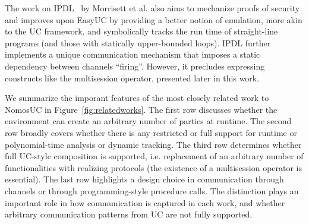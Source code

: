 The work on IPDL~\cite{ipdl} by Morrisett et al. also aims to mechanize proofs of security and improves upon EasyUC by providing a better notion of emulation,
more akin to the UC framework, and symbolically tracks the run time of straight-line programs (and those with statically upper-bounded loops).
IPDL further implements a unique communication mechanism that imposes a static dependency between channels ``firing''.
However, it precludes expressing constructs like the multisession operator, presented later in this work. 

We summarize the imporant features of the most closely related work to NomosUC in Figure~\ref{fig:relatedworks}.
The first row discusses whether the environment can create an arbitrary number of parties at runtime. %
The second row broadly covers whether there is any restricted or full support for runtime or polynomial-time analysis or dynamic tracking. %
The third row determines whether full UC-style composition is supported, i.e. replacement of an arbitrary number of functionalities with realizing protocols (the existence of a multisession operator is essential). 
The last row highlights a design choice in communication through channels or through programming-style procedure calls.
The distinction plays an important role in how communication is captured in each work, and whether arbitrary communication patterns from UC are not fully supported.


